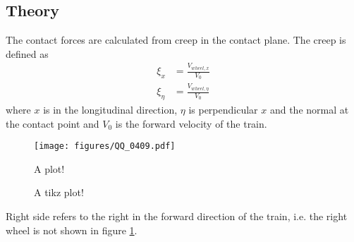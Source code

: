 
\subsection{Theory}
The contact forces are calculated from creep in the contact plane.
The creep is defined as 
\begin{align}
 \xi_x    &= \frac{V_{wheel,x}}{V_0}\\
 \xi_\eta &= \frac{V_{wheel,\eta}}{V_0}
\end{align}
where $x$ is in the longitudinal direction, $\eta$ is perpendicular $x$ and the normal at the contact point and $V_0$ is the forward velocity of the train.

\begin{figure}[htpb!]
 \centering
  \texttt{[image: figures/QQ\_0409.pdf]}
 \caption{A plot!}
 \label{fig:plot} %
\end{figure}

\begin{figure}[htpb!]
\centering
{}
 \caption{A tikz plot!}
 \label{fig:tikz_plot}
\end{figure}

Right side refers to the right in the forward direction of the train, i.e. the right wheel is not shown in figure \ref{fig:plot}.

